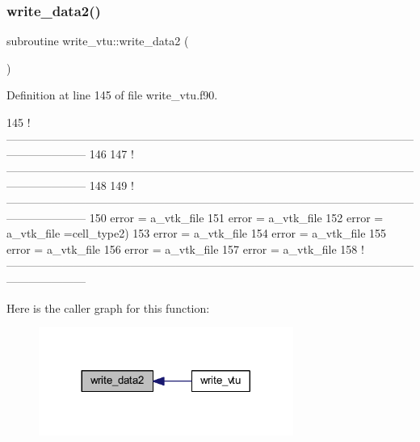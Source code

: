 \subsubsection{\texorpdfstring{write\+\_\+data2()}{write\_data2()}}
{\footnotesize\ttfamily subroutine write\+\_\+vtu\+::write\+\_\+data2 (\begin{DoxyParamCaption}{ }\end{DoxyParamCaption})}



Definition at line 145 of file write\+\_\+vtu.\+f90.


\begin{DoxyCode}
145   \textcolor{comment}{
      !---------------------------------------------------------------------------------------------------------------------------------}
146   
147   \textcolor{comment}{
      !---------------------------------------------------------------------------------------------------------------------------------}
148 
149   \textcolor{comment}{
      !---------------------------------------------------------------------------------------------------------------------------------}
150   error = a\_vtk\_file%
151   error = a\_vtk\_file%
152   error = a\_vtk\_file%
      =cell\_type2)
153   error = a\_vtk\_file%
154   error = a\_vtk\_file%
155   error = a\_vtk\_file%
156   error = a\_vtk\_file%
157   error = a\_vtk\_file%
158   \textcolor{comment}{
      !---------------------------------------------------------------------------------------------------------------------------------}
\end{DoxyCode}
Here is the caller graph for this function\+:\nopagebreak
\begin{figure}[H]
\begin{center}
\leavevmode
\includegraphics[width=236pt]{write__vtu_8f90_ad806107886f0521aac56740b4a2aaf62_icgraph}
\end{center}
\end{figure}
\mbox{\label{write__vtu_8f90_ab859d2be74950aa978bc251eddf0b307}} 
